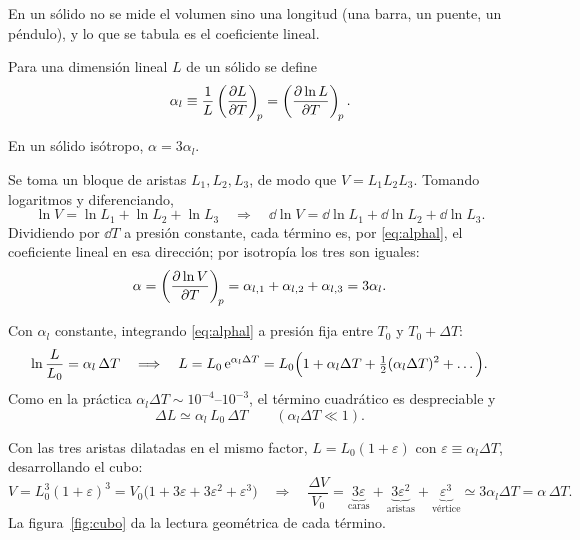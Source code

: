 En un sólido no se mide el volumen sino una longitud (una barra, un puente, un péndulo), y lo que se
tabula es el coeficiente lineal.

\begin{definicion}
Para una dimensión lineal $L$ de un sólido se define
\begin{equation}\label{eq:alphal}
  \alpha_l\equiv\frac1L\left(\frac{\partial L}{\partial T}\right)_{\!p}=\left(\frac{\partial \ln L}{\partial T}\right)_{\!p}.
\end{equation}
\end{definicion}

\begin{proposicion}
En un sólido isótropo, $\alpha=3\alpha_l$.
\end{proposicion}

\begin{demostracion}
Se toma un bloque de aristas $L_1,L_2,L_3$, de modo que $V=L_1L_2L_3$. Tomando logaritmos y diferenciando,
\[
  \ln V=\ln L_1+\ln L_2+\ln L_3\quad\Longrightarrow\quad \dd\ln V=\dd\ln L_1+\dd\ln L_2+\dd\ln L_3.
\]
Dividiendo por $\dd T$ a presión constante, cada término es, por \eqref{eq:alphal}, el coeficiente lineal
en esa dirección; por isotropía los tres son iguales:
\[
  \alpha=\left(\frac{\partial \ln V}{\partial T}\right)_{\!p}=\alpha_{l,1}+\alpha_{l,2}+\alpha_{l,3}=3\alpha_l.
\]
\end{demostracion}

 Con $\alpha_l$ constante, integrando \eqref{eq:alphal} a presión fija
entre $T_0$ y $T_0+\Delta T$:
\begin{equation}\label{eq:Lexp}
  \ln\frac{L}{L_0}=\alpha_l\,\Delta T\quad\Longrightarrow\quad
  L=L_0\,\mathrm{e}^{\alpha_l\Delta T}=L_0\Bigl(1+\alpha_l\Delta T+\tfrac12(\alpha_l\Delta T)^2+\dots\Bigr).
\end{equation}
Como en la práctica $\alpha_l\Delta T\sim10^{-4}$--$10^{-3}$, el término cuadrático es despreciable y
\begin{equation}\label{eq:DL}
  \boxed{\Delta L\simeq\alpha_l\,L_0\,\Delta T}\qquad(\alpha_l\Delta T\ll1).
\end{equation}

 Con las tres aristas dilatadas en el mismo factor,
$L=L_0(1+\varepsilon)$ con $\varepsilon\equiv\alpha_l\Delta T$, desarrollando el cubo:
\begin{equation}\label{eq:cubo}
  V=L_0^3(1+\varepsilon)^3=V_0\bigl(1+3\varepsilon+3\varepsilon^2+\varepsilon^3\bigr)
  \quad\Longrightarrow\quad
  \frac{\Delta V}{V_0}=\underbrace{3\varepsilon}_{\text{caras}}+\underbrace{3\varepsilon^2}_{\text{aristas}}
  +\underbrace{\varepsilon^3}_{\text{vértice}}\simeq3\alpha_l\Delta T=\alpha\,\Delta T.
\end{equation}
La figura~\ref{fig:cubo} da la lectura geométrica de cada término.

